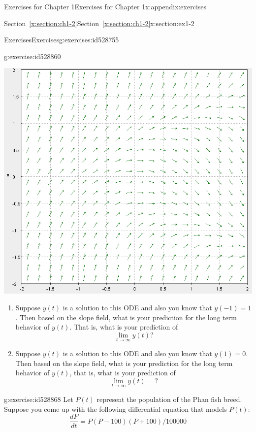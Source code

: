 \documentclass[oneside,10pt,]{book}
\newcommand{\xreffont}{\relax}
\numberwithin{equation}{section}
\numberwithin{equation}{section}
\begin{document}
\begin{appendixptx}{Exercises for Chapter 1}{}{Exercises for Chapter 1}{}{}{x:appendix:exercises}
\begin{sectionptx}{Section~{\xreffont\ref*{x:section:ch1-2}}}{}{Section~{\xreffont\ref*{x:section:ch1-2}}}{}{}{x:section:ex1-2}
\begin{exercises-subsection-numberless}{Exercises}{}{Exercises}{}{}{g:exercises:id528755}
\begin{divisionexercise}{3}{}{}{g:exercise:id528860}
\begin{image}{0}{1}{0}
\includegraphics[width=\linewidth]{images/HWc1s2-2.png}
\end{image}%
%
\begin{enumerate}[label=(\alph*)]
\item{}Suppose \(y(t)\) is a solution to this ODE and also you know that \(y\left(-1\right)=1\). Then based on the slope field, what is your prediction for the long term behavior of \(y(t)\). That is, what is your prediction of%
\begin{equation*}
\lim_{t\to\infty}y(t)?
\end{equation*}
%
\item{}Suppose \(y(t)\) is a solution to this ODE and also you know that \(y\left(1\right)=0\). Then based on the slope field, what is your prediction for the long term behavior of \(y(t)\), that is, what is your prediction of%
\begin{equation*}
\lim_{t\to\infty}y(t)=?
\end{equation*}
%
\end{enumerate}
\end{divisionexercise}%
\begin{divisionexercise}{4}{}{}{g:exercise:id528868}%
Let \(P(t)\) represent the population of the Phan fish breed. Suppose you come up with the following differential equation that models \(P(t)\):%
\begin{equation*}
\frac{dP}{dt}=P\left(P-100\right)\left(P+100\right)/100000
\end{equation*}

\end{divisionexercise}
\end{exercises-subsection-numberless}
\end{sectionptx}
\end{appendixptx}
\end{document}
